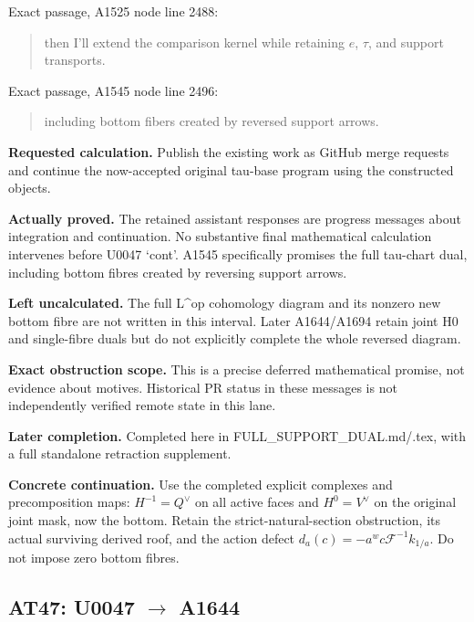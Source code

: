 \documentclass[10pt,a4paper,oneside]{report}
\begin{document}
Exact passage, A1525 node
\protect{} line 2488:

\begin{quote}
then I'll extend the comparison kernel while retaining \(e\), \(\tau\),
and support transports.
\end{quote}

Exact passage, A1545 node
\protect{} line 2496:

\begin{quote}
including bottom fibers created by reversed support arrows.
\end{quote}

\textbf{Requested calculation.} Publish the existing work as GitHub
merge requests and continue the now-accepted original tau-base program
using the constructed objects.

\textbf{Actually proved.} The retained assistant responses are progress
messages about integration and continuation. No substantive final
mathematical calculation intervenes before U0047 `cont'. A1545
specifically promises the full tau-chart dual, including bottom fibres
created by reversing support arrows.

\textbf{Left uncalculated.} The full L\^{}op cohomology diagram and its
nonzero new bottom fibre are not written in this interval. Later
A1644/A1694 retain joint H0 and single-fibre duals but do not explicitly
complete the whole reversed diagram.

\textbf{Exact obstruction scope.} This is a precise deferred
mathematical promise, not evidence about motives. Historical PR status
in these messages is not independently verified remote state in this
lane.

\textbf{Later completion.} Completed here in
FULL\_SUPPORT\_DUAL.md/.tex, with a full standalone retraction
supplement.

\textbf{Concrete continuation.} Use the completed explicit complexes and
precomposition maps: \(H^{-1}=Q^\vee\) on all active faces and
\(H^0=V^\vee\) on the original joint mask, now the bottom. Retain the
strict-natural-section obstruction, its actual surviving derived roof,
and the action defect \(d_a(c)=-a^w c\mathcal F^{-1}k_{1/a}\). Do not
impose zero bottom fibres.

\subsection{\texorpdfstring{AT47: U0047
\allowbreak{}\ensuremath{→}\allowbreak{}
A1644}{AT47: U0047  A1644}}\label{at47-u0047-a1644}
\end{document}

